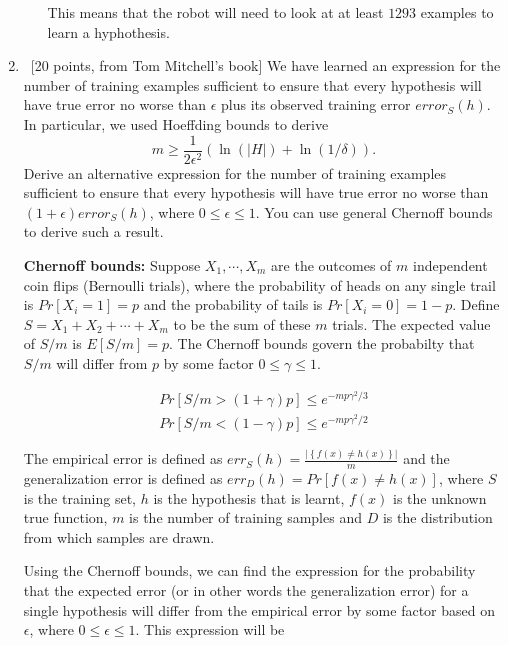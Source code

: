 \begin{enumerate}
\begin{itemize}
This means that the robot will need to look at at least $1293$ examples to learn a hyphothesis.

\end{itemize}


\item ~[20 points, from Tom Mitchell's book] We have learned an
  expression for the number of training examples sufficient to ensure
  that every hypothesis will have true error no worse than $\epsilon$
  plus its observed training error $error_S(h)$. In particular, we
  used Hoeffding bounds to derive
\[
	m \geq  \frac{1}{2 \epsilon^2}(\ln(|H|) + \ln(1/\delta)).
\]
Derive an alternative expression for the number of training examples
sufficient to ensure that every hypothesis will have true error no
worse than $(1+\epsilon)error_S(h)$, where $0 \leq \epsilon \leq 1$. You can use general Chernoff bounds
to derive such a result.

{\bf Chernoff bounds:} Suppose $X_1, \cdots, X_m$ are the outcomes of $m$ independent coin flips (Bernoulli trials), where the probability of heads on any single trail is $Pr[X_i = 1] = p$ and the probability of tails is $Pr[X_i = 0] = 1 - p$. Define $S = X_1 + X_2 + \cdots + X_m$ to be the sum of these $m$ trials. The expected value of $S/m$ is $E[S/m] = p$. The Chernoff bounds govern the probabilty that $S/m$ will differ from $p$ by some factor $0 \leq \gamma \leq 1$.

\begin{equation}
    \begin{array}{rcl}
	Pr[S/m > (1 + \gamma) p ] \leq e^{{-mp\gamma^2}/3}\\
	Pr[S/m < (1 - \gamma) p ] \leq e^{{-mp\gamma^2}/2}
	\end{array}
\end{equation}

The empirical error is defined as $err_S(h) = \frac{\left | \left \{ f(x) \neq h(x) \right \} \right |}{m}$ and the generalization error is defined as $err_D(h) =  Pr \left [ f(x) \neq h(x) \right ]$, where $S$ is the training set, $h$ is the hypothesis that is learnt, $f(x)$ is the unknown true function, $m$ is the number of training samples and $D$ is the distribution from which samples are drawn.

Using the Chernoff bounds, we can find the expression for the probability that the expected error (or in other words the generalization error) for a single hypothesis will differ from the empirical error by some factor based on $\epsilon$, where $0 \leq \epsilon \leq 1$. This expression will be


\end{enumerate}
